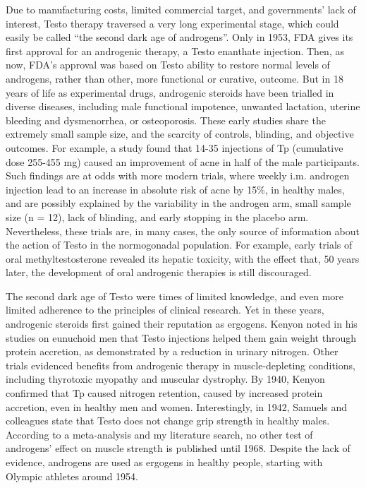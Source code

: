 \documentclass[12pt,english]{report}\usepackage[]{graphicx}\usepackage[]{color}
\begin{document}
Due to manufacturing costs, limited commercial target, and governments'
lack of interest, Testo therapy traversed a very long experimental
stage, which could easily be called ``the second dark age of androgens''.
Only in 1953, FDA gives its first approval for an androgenic therapy,
a Testo enanthate injection. Then, as now, FDA's approval was based
on Testo ability to restore normal levels of androgens, rather than
other, more functional or curative, outcome\citep{endopharmaceuticalssolutionsinc.2014delatestryl}.
But in 18 years of life as experimental drugs, androgenic steroids
have been trialled in diverse diseases, including male functional
impotence\citep{spence1940testosterone}, unwanted lactation\citep{kurzrok1938inhibition},
uterine bleeding and dysmenorrhea\citep{black1942use}, or osteoporosis\citep{reifenstein1947metabolic}.
These early studies share the extremely small sample size, and the
scarcity of controls, blinding, and objective outcomes. For example,
a study found that 14-35 injections of Tp (cumulative dose 255-455
mg) caused an improvement of acne in half of the male participants\citep{molitch1938treatment}.
Such findings are at odds with more modern trials, where weekly i.m.
androgen injection lead to an increase in absolute risk of acne by
15\%, in healthy males\citep{mommers2008male}, and are possibly explained
by the variability in the androgen arm, small sample size (n = 12),
lack of blinding, and early stopping in the placebo arm. Nevertheless,
these trials are, in many cases, the only source of information about
the action of Testo in the normogonadal population. For example, early
trials of oral methyltestosterone revealed its hepatic toxicity, with
the effect that, 50 years later, the development of oral androgenic
therapies is still discouraged.

The second dark age of Testo were times of limited knowledge, and
even more limited adherence to the principles of clinical research.
Yet in these years, androgenic steroids first gained their reputation
as ergogens. Kenyon noted in his studies on eunuchoid men that Testo
injections helped them gain weight through protein accretion, as demonstrated
by a reduction in urinary nitrogen. Other trials evidenced benefits
from androgenic therapy in muscle-depleting conditions, including
thyrotoxic myopathy\citep{kinsell1944effect} and muscular dystrophy\citep{hesser1940muscle}.
By 1940, Kenyon confirmed that Tp caused nitrogen retention, caused
by increased protein accretion, even in healthy men and women\citep{kenyon1940comparative}.
Interestingly, in 1942, Samuels and colleagues state that Testo does
not change grip strength in healthy males\citep{samuels1942influence}.
According to a meta-analysis\citep{elashoff1991effects} and my literature
search, no other test of androgens' effect on muscle strength is published
until 1968. Despite the lack of evidence, androgens are used as ergogens
in healthy people, starting with Olympic athletes around 1954\citep{cowart1987steroids}.
\end{document}
